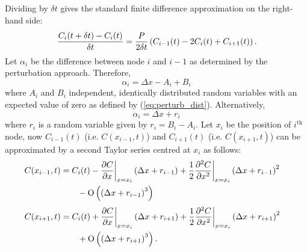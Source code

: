\documentclass[11pt,titlepage,a4paper]{article}
\begin{document}
		  	Dividing by $\delta t$ gives the standard finite difference approximation on the right-hand side:
		  	\begin{align}
			  	\phantom{\frac{C(x_i, t + \delta t) - C(x_i, t)}{\delta t}}
			  	&\begin{aligned}
			    	\mathllap{\frac{C_i(t + \delta t) - C_i(t)}{\delta t}} &= \frac{P}{2 \delta t} \left(C_{i-1}(t) - 2 C_i(t) + C_{i+1}(t) \right).
			    \end{aligned}
			    \label{eq:conservationSimplified}
		  	\end{align}
		  	Let $\alpha_i$ be the difference between node $i$ and $i-1$ as determined by the perturbation approach. Therefore,
		  	\begin{equation*}
		  		\alpha_i = \Delta x - A_i + B_i
		  	\end{equation*}
		  	where $A_i$ and $B_i$ independent, identically distributed random variables with an expected value of zero as defined by (\ref{eq:perturb_dist}). Alternatively,
		  	\begin{equation*}
		  		\alpha_i = \Delta x + r_i
		  	\end{equation*}
		  	where $r_i$ is a random variable given by $r_i = B_i - A_i$. Let $x_i$ be the position of $i^{\text{th}}$ node, now $C_{i-1}(t)$ (i.e. $C(x_{i-1}, t)$) and $C_{i+1}(t)$ (i.e. $C(x_{i+1}, t)$) can be approximated by a second Taylor series centred at $x_i$ as follows: 
		  	\begin{align*}
			  	\phantom{C(x_{i-1}, t)}
			  	&\begin{aligned}
			    	\mathllap{C(x_{i-1}, t)} &=  C_i(t) - \frac{\partial C}{\partial x}\bigg|_{x=x_i} \left (\Delta x + r_{i-1} \right) + \frac{1}{2} \frac{\partial^2 C}{\partial x^2}\bigg|_{x=x_i} \left (\Delta x + r_{i-1} \right)^2 \\
			    	&\qquad - \text{O} \left( \left(\Delta x + r_{i-1} \right)^3 \right)
			    \end{aligned}
		  	\end{align*}
		  	\begin{align*}
		  		\phantom{C(x_{i+1}, t)}
		  		&\begin{aligned}
			    	\mathllap{C(x_{i+1}, t)} &=  C_i(t) + \frac{\partial C}{\partial x}\bigg|_{x=x_i} \left (\Delta x + r_{i+1} \right) + \frac{1}{2} \frac{\partial^2 C}{\partial x^2}\bigg|_{x=x_i} \left (\Delta x + r_{i+1} \right)^2 \\
			    	&\qquad + \text{O} \left( \left(\Delta x + r_{i+1} \right)^3 \right).
			    \end{aligned}
		  	\end{align*}
\end{document}
